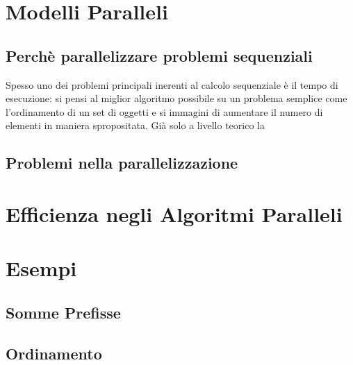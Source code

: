 \chapter{Modelli Paralleli}
\section{Perchè parallelizzare problemi sequenziali}
Spesso uno dei problemi principali inerenti al calcolo sequenziale è il tempo di esecuzione: si pensi al miglior algoritmo possibile su un problema semplice come l'ordinamento di un set di oggetti e si immagini di aumentare il numero di elementi in maniera spropositata. Già solo a livello teorico la 
\section{Problemi nella parallelizzazione}

\chapter{Efficienza negli Algoritmi Paralleli}


\chapter{Esempi}

\section{Somme Prefisse}

\section{Ordinamento}